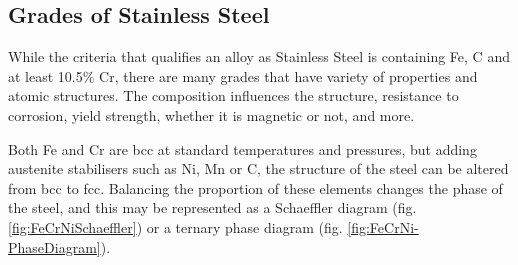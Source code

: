 \subsection{Grades of Stainless Steel}

While the criteria that qualifies an alloy as Stainless Steel is containing Fe, \Gls{C} and at least 10.5\% Cr, there are many grades that have variety of properties and atomic structures.  The composition influences the structure, resistance to corrosion, yield strength, whether it is magnetic or not, and more.

Both Fe and Cr are \acrshort{bcc} at standard temperatures and pressures, but adding austenite stabilisers such as Ni, Mn or C, the structure of the steel can be altered from \acrshort{bcc} to \acrshort{fcc}.  Balancing the proportion of these elements changes the phase of the steel, and this may be represented as a Schaeffler diagram (fig. \ref{fig:FeCrNiSchaeffler}) or a ternary phase diagram (fig. \ref{fig:FeCrNi-PhaseDiagram}).

